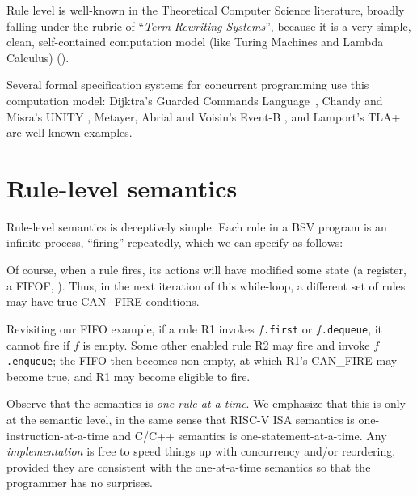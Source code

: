 Rule level is well-known in the Theoretical Computer Science
literature, broadly falling under the rubric of ``\emph{Term Rewriting
Systems}'', because it is a very simple, clean, self-contained
computation model (like Turing Machines and Lambda Calculus)
(\cite{Baader98a,Kamperman1996a,Klop1992a,Terese2003}).

Several formal specification systems for concurrent programming use
this computation model: Dijktra's Guarded Commands
Language~\cite{Dijkstra1976}, Chandy and Misra's UNITY
\cite{Chandy1988a}, Metayer, Abrial and Voisin's Event-B
\cite{Metayer2005a}, and Lamport's TLA+ \cite{Lamport2002a} are
well-known examples.


\section{Rule-level semantics}

Rule-level semantics is deceptively simple.  Each rule in a BSV
program is an infinite process, ``firing'' repeatedly, which we can
specify as follows:

\begin{center}
\end{center}

Of course, when a rule fires, its actions will have modified some
state (a register, a FIFOF, {\etc}).  Thus, in the next iteration of
this while-loop, a different set of rules may have true CAN\_FIRE
conditions.

Revisiting our FIFO example, if a rule R1 invokes $f$\verb|.first| or
$f$\verb|.dequeue|, it cannot fire if $f$ is empty.  Some other
enabled rule R2 may fire and invoke $f$\verb|.enqueue|; the FIFO then
becomes non-empty, at which R1's CAN\_FIRE may become true, and R1 may
become eligible to fire.

Observe that the semantics is \emph{one rule at a time}.  We emphasize
that this is only at the semantic level, in the same sense that RISC-V
ISA semantics is one-instruction-at-a-time and C/C++ semantics is
one-statement-at-a-time.  Any \emph{implementation} is free to speed
things up with concurrency and/or reordering, provided they are
consistent with the one-at-a-time semantics so that the programmer has
no surprises.

